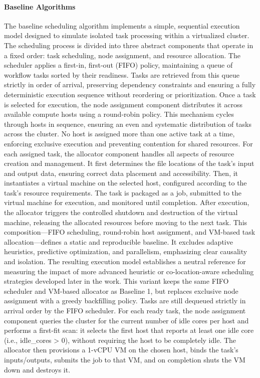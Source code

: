 \paragraph{Baseline Algorithms}
\label{sec:baseline_algorithms}
The baseline scheduling algorithm implements a simple, sequential execution model designed to simulate isolated task processing within a virtualized cluster. The scheduling process is divided into three abstract components that operate in a fixed order: task scheduling, node assignment, and resource allocation. The scheduler applies a first-in, first-out (FIFO) policy, maintaining a queue of workflow tasks sorted by their readiness. Tasks are retrieved from this queue strictly in order of arrival, preserving dependency constraints and ensuring a fully deterministic execution sequence without reordering or prioritization.
Once a task is selected for execution, the node assignment component distributes it across available compute hosts using a round-robin policy. This mechanism cycles through hosts in sequence, ensuring an even and systematic distribution of tasks across the cluster. No host is assigned more than one active task at a time, enforcing exclusive execution and preventing contention for shared resources.
For each assigned task, the allocator component handles all aspects of resource creation and management. It first determines the file locations of the task’s input and output data, ensuring correct data placement and accessibility. Then, it instantiates a virtual machine on the selected host, configured according to the task’s resource requirements. The task is packaged as a job, submitted to the virtual machine for execution, and monitored until completion. After execution, the allocator triggers the controlled shutdown and destruction of the virtual machine, releasing the allocated resources before moving to the next task.
This composition—FIFO scheduling, round-robin host assignment, and VM-based task allocation—defines a static and reproducible baseline. It excludes adaptive heuristics, predictive optimization, and parallelism, emphasizing clear causality and isolation. The resulting execution model establishes a neutral reference for measuring the impact of more advanced heuristic or co-location-aware scheduling strategies developed later in the work.
This variant keeps the same FIFO scheduler and VM-based allocator as Baseline 1, but replaces exclusive node assignment with a greedy backfilling policy. Tasks are still dequeued strictly in arrival order by the FIFO scheduler. For each ready task, the node assignment component queries the cluster for the current number of idle cores per host and performs a first-fit scan: it selects the first host that reports at least one idle core (i.e., idle_cores > 0), without requiring the host to be completely idle. The allocator then provisions a 1-vCPU VM on the chosen host, binds the task’s inputs/outputs, submits the job to that VM, and on completion shuts the VM down and destroys it.
